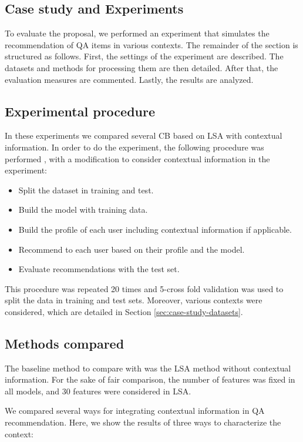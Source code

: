 \documentclass[preprint]{elsarticle}
\begin{document}
\begin{spacing}{1.5}
\section{Case study and Experiments}
\label{sec:case-study}

To evaluate the proposal, we performed an experiment that simulates the recommendation of QA items in various contexts. The remainder of the section is structured as follows. First, the settings of the experiment are described. The datasets and methods for processing them are then detailed. After that, the evaluation measures are commented. Lastly, the results are analyzed.

\subsection{Experimental procedure}

In these experiments we compared several CB based on LSA with contextual information. In order to do the experiment, the following procedure was performed \cite{Sarwar2001}, with a modification to consider contextual information in the experiment:
\begin{itemize}
	\item Split the dataset in training and test.
	\item Build the model with training data.
	\item Build the profile of each user including contextual information if applicable.
	\item Recommend to each user based on their profile and the model.
	\item Evaluate recommendations with the test set.
\end{itemize}

This procedure was repeated 20 times and 5-cross fold validation was used to split the data in training and test sets. Moreover, various contexts were considered, which are detailed in Section \ref{sec:case-study-datasets}.

\subsection{Methods compared}

The baseline method to compare with was the LSA method without contextual information. For the sake of fair comparison, the number of features was fixed in all models, and 30 features were considered in LSA.

We compared several ways for integrating contextual information in QA recommendation. Here, we show the results of three ways to characterize the context:


\end{spacing}
\end{document}
